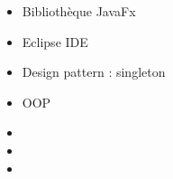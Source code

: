 \documentclass{article}
\begin{document}
\begin{tabular}
\begin{itemize}
\begin{itemize}
            \item \textcolor{gray!80}{Bibliothèque JavaFx}
            \item \textcolor{gray!80}{Eclipse IDE}
            \item \textcolor{gray!80}{Design pattern : singleton }
            \item \textcolor{gray!80}{OOP}
            \item[\textcolor{white}{}] {} %
            \item[\textcolor{white}{}] {} %
            \item[\textcolor{white}{}] {} %
     
        \end{itemize}
    \end{itemize}
\end{tabular}




\begin{center}
\end{center}
\end{document}

